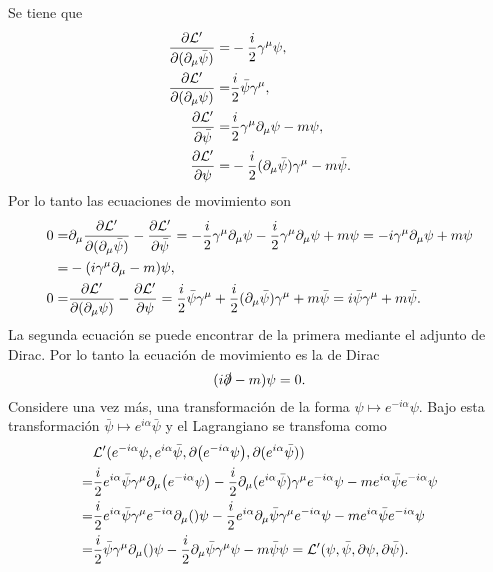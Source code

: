 \documentclass{article}
\begin{document}
Se tiene que
\begin{align}
\begin{split}
\pdv{\mathcal{L}'}{(\partial_\mu\bar{\psi})}=&-\frac{i}{2}\gamma^\mu\psi,\\
\pdv{\mathcal{L}'}{(\partial_\mu\psi)}=&\frac{i}{2}\bar{\psi}\gamma^\mu,\\
\pdv{\mathcal{L}'}{\bar{\psi}}=&\frac{i}{2}\gamma^\mu\partial_\mu\psi-m\psi,\\
\pdv{\mathcal{L}'}{\psi}=&-\frac{i}{2}(\partial_\mu\bar{\psi})\gamma^\mu-m\bar{\psi}.
\end{split}
\end{align}
Por lo tanto las ecuaciones de movimiento son
\begin{align}
\begin{split}
0=&\partial_\mu\pdv{\mathcal{L}'}{(\partial_\mu\bar{\psi})}-\pdv{\mathcal{L}'}{\bar{\psi}}=-\frac{i}{2}\gamma^\mu\partial_\mu\psi-\frac{i}{2}\gamma^\mu\partial_\mu\psi+m\psi=-i\gamma^\mu\partial_\mu\psi+m\psi\\
=&-\qty(i\gamma^\mu\partial_\mu-m)\psi,\\
0=&\pdv{\mathcal{L}'}{(\partial_\mu\psi)}-\pdv{\mathcal{L}'}{\psi}=\frac{i}{2}\bar{\psi}\gamma^\mu+\frac{i}{2}(\partial_\mu\bar{\psi})\gamma^\mu+m\bar{\psi}=i\bar{\psi}\gamma^\mu+m\bar{\psi}.
\end{split}
\end{align}
La segunda ecuación se puede encontrar de la primera mediante el adjunto de Dirac. Por lo tanto la ecuación de movimiento es la de Dirac
\begin{equation}
(i\slashed{\partial}-m)\psi=0.
\end{equation}
Considere una vez más, una transformación de la forma $\psi\mapsto e^{-i\alpha}\psi$. Bajo esta transformación $\bar{\psi}\mapsto e^{i\alpha}\bar{\psi}$ y el Lagrangiano se transfoma como
\begin{align}
\begin{split}
&\mathcal{L}'(e^{-i\alpha}\psi,e^{i\alpha}\bar{\psi},\partial\qty(e^{-i\alpha}\psi),\partial(e^{i\alpha}\bar{\psi}))\\
=&\frac{i}{2}e^{i\alpha}\bar{\psi}\gamma^\mu\partial_\mu\qty(e^{-i\alpha}\psi)-\frac{i}{2}\partial_\mu(e^{i\alpha}\bar{\psi})\gamma^\mu e^{-i\alpha}\psi-me^{i\alpha}\bar{\psi}e^{-i\alpha}\psi\\
=&\frac{i}{2}e^{i\alpha}\bar{\psi}\gamma^\mu e^{-i\alpha}\partial_\mu\qty\psi-\frac{i}{2}e^{i\alpha}\partial_\mu\bar{\psi}\gamma^\mu e^{-i\alpha}\psi-me^{i\alpha}\bar{\psi}e^{-i\alpha}\psi\\
=&\frac{i}{2}\bar{\psi}\gamma^\mu\partial_\mu\qty\psi-\frac{i}{2}\partial_\mu\bar{\psi}\gamma^\mu\psi-m\bar{\psi}\psi=\mathcal{L}'(\psi,\bar{\psi},\partial\psi,\partial\bar{\psi}).
\end{split}
\end{align}
\end{document}
